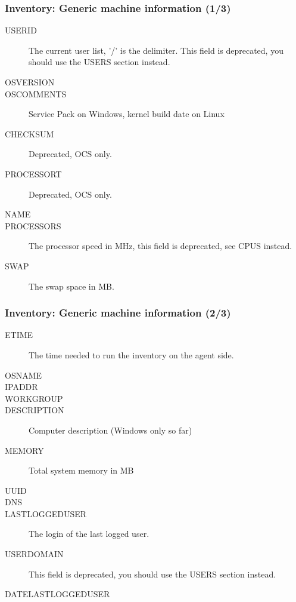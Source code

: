 \documentclass{beamer}
\begin{document}
\begin{frame}
\frametitle{Inventory: Generic machine information (1/3)}
\begin{description}
      \item[USERID] The current user list, '/' is the delimiter. This field is deprecated, you should use the USERS section instead.
      \item[OSVERSION]
      \item[OSCOMMENTS] Service Pack on Windows, kernel build date on Linux
      \item[CHECKSUM] Deprecated, OCS only.
      \item[PROCESSORT] Deprecated, OCS only.
      \item[NAME]
      \item[PROCESSORS] The processor speed in MHz, this field is deprecated, see CPUS instead.
      \item[SWAP] The swap space in MB.
\end{description}
\end{frame}
\begin{frame}
\frametitle{Inventory: Generic machine information (2/3)}
\begin{description}

      \item[ETIME] The time needed to run the inventory on the agent side.
      \item[OSNAME]
      \item[IPADDR]
      \item[WORKGROUP]
      \item[DESCRIPTION] Computer description (Windows only so far)
      \item[MEMORY] Total system memory in MB
      \item[UUID]
      \item[DNS]
      \item[LASTLOGGEDUSER] The login of the last logged user.
      \item[USERDOMAIN] This field is deprecated, you should use the USERS section instead.
      \item[DATELASTLOGGEDUSER]
\end{description}
\end{frame}
\end{document}
